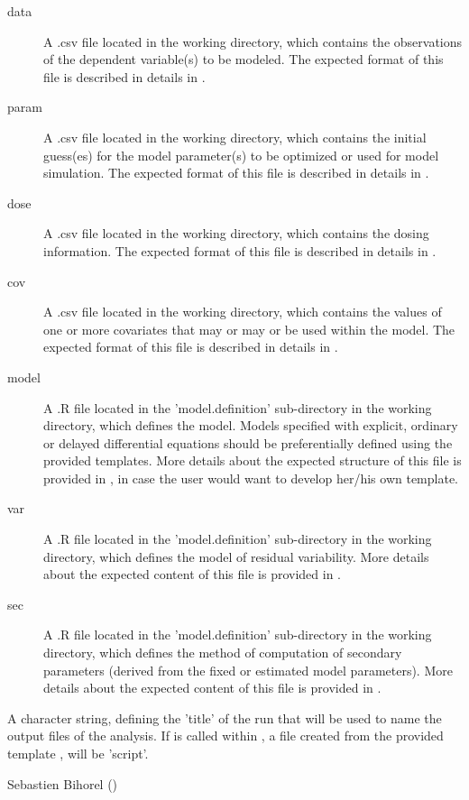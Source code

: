 \begin{Arguments}
\begin{ldescription}
\begin{description}
\item[data] A .csv file located in the working directory, which contains
the observations of the dependent variable(s) to be modeled. The
expected format of this file is described in details in
.
\item[param] A .csv file located in the working directory, which contains
the initial guess(es) for the model parameter(s) to be optimized or used
for model simulation. The expected format of this file is described in
details in .
\item[dose] A .csv file located in the working directory, which contains
the dosing information. The expected format of this file is described in
details in .
\item[cov] A .csv file located in the working directory, which contains
the values of one or more covariates that may or may or be used within
the model. The expected format of this file is described in details in
.
\item[model] A .R file located in the 'model.definition'
sub-directory in the working directory, which defines the model. Models
specified with explicit, ordinary or delayed differential equations
should be preferentially defined using the provided templates. More
details about the expected structure of this file is provided in
, in case the user would
want to develop her/his own template.
\item[var] A .R file located in the 'model.definition' sub-directory
in the working directory, which defines the model of residual
variability. More details about the expected content of this file is
provided in .
\item[sec] A .R file located in the 'model.definition' sub-directory
in the working directory, which defines the method of computation of
secondary parameters (derived from the fixed or estimated model
parameters). More details about the expected content of this file is
provided in .

\end{description}


\item[\code{analysis}] A character string, defining the 'title' of the run that will
be used to name the output files of the analysis. If
 is called within , a file created
from the provided template ,  will be 'script'.
\end{ldescription}
\end{Arguments}
%
\begin{Author}\relax
Sebastien Bihorel ()
\end{Author}
%
\begin{SeeAlso}\relax
{}
\end{SeeAlso}
